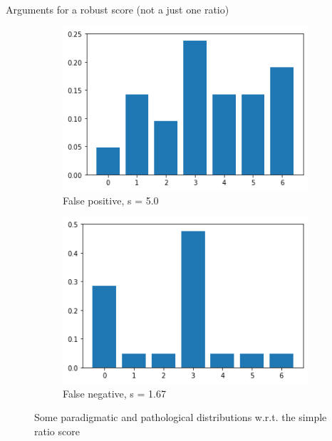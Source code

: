 \documentclass[xcolor=table, hyperref={pdfpagelabels=false}]{beamer}
\begin{document}
\begin{frame}{Arguments for a robust score (not a just one ratio)}
\begin{figure}[H]
\begin{subfigure}[t]{.4\textwidth}
		\includegraphics[width=\textwidth]{./images/false_positive.png}
		\caption{False positive, s = 5.0}
		\label{fig:false_positive}
	\end{subfigure}
	\begin{subfigure}[t]{.4\textwidth}
		\includegraphics[width=\textwidth]{./images/false_negative.png}
		\caption{False negative, s = 1.67}
		\label{fig:false_negative}
	\end{subfigure}
	\caption{Some paradigmatic and pathological distributions w.r.t. the simple ratio score}
	\label{fig:pathological}
\end{figure}
\end{frame}
\end{document}
